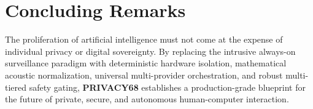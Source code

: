 \section{Concluding Remarks}
The proliferation of artificial intelligence must not come at the expense of individual privacy or digital sovereignty. By replacing the intrusive always-on surveillance paradigm with deterministic hardware isolation, mathematical acoustic normalization, universal multi-provider orchestration, and robust multi-tiered safety gating, \textbf{PRIVACY68} establishes a production-grade blueprint for the future of private, secure, and autonomous human-computer interaction.
